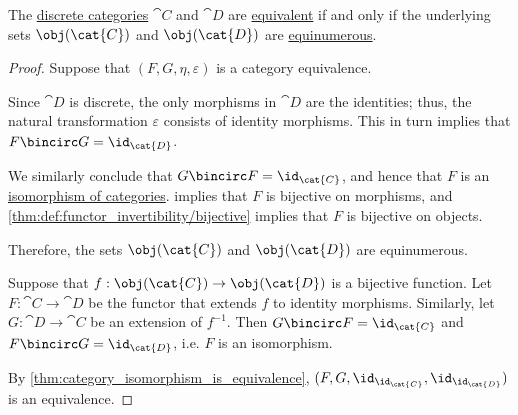 \begin{proposition}\label{thm:discrete_category_equivalence}
  The \hyperref[def:discrete_category]{discrete categories} \( \cat{C} \) and \( \cat{D} \) are \hyperref[def:equivalence_of_categories]{equivalent} if and only if the underlying sets \( \obj(\cat{C}) \) and \( \obj(\cat{D}) \) are \hyperref[def:equinumerosity]{equinumerous}.
\end{proposition}
\begin{proof}
  \SufficiencySubProof Suppose that \( (F, G, \eta, \varepsilon) \) is a category equivalence.

  Since \( \cat{D} \) is discrete, the only morphisms in \( \cat{D} \) are the identities; thus, the natural transformation \( \varepsilon \) consists of identity morphisms. This in turn implies that \( F \bincirc G = \id_{\cat{D}} \).

  We similarly conclude that \( G \bincirc F = \id_{\cat{C}} \), and hence that \( F \) is an \hyperref[def:isomorphism_of_categories]{isomorphism of categories}.  implies that \( F \) is bijective on morphisms, and \cref{thm:def:functor_invertibility/bijective} implies that \( F \) is bijective on objects.

  Therefore, the sets \( \obj(\cat{C}) \) and \( \obj(\cat{D}) \) are equinumerous.

  \NecessitySubProof Suppose that \( f: \obj(\cat{C}) \to \obj(\cat{D}) \) is a bijective function. Let \( F: \cat{C} \to \cat{D} \) be the functor that extends \( f \) to identity morphisms. Similarly, let \( G: \cat{D} \to \cat{C} \) be an extension of \( f^{-1} \). Then \( G \bincirc F = \id_{\cat{C}} \) and \( F \bincirc G = \id_{\cat{D}} \), i.e. \( F \) is an isomorphism.

  By \cref{thm:category_isomorphism_is_equivalence}, \( (F, G, \id_{\id_{\cat{C}}}, \id_{\id_{\cat{D}}}) \) is an equivalence.
\end{proof}

